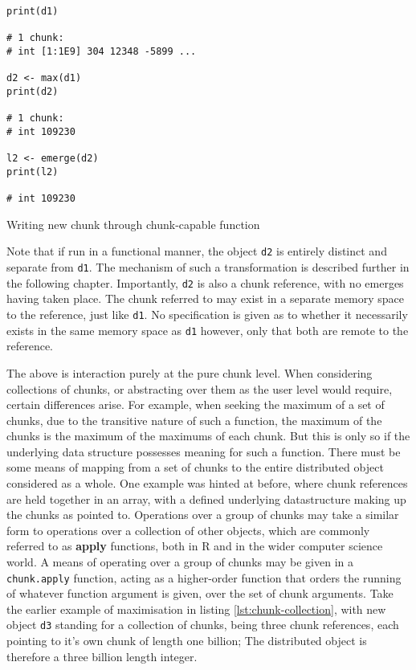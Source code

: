 \begin{listing}
    \begin{verbatim}
print(d1)

# 1 chunk:
# int [1:1E9] 304 12348 -5899 ...

d2 <- max(d1)
print(d2)

# 1 chunk:
# int 109230

l2 <- emerge(d2)
print(l2)

# int 109230
    \end{verbatim}
    \caption{Writing new chunk through chunk-capable function}
    \label{lst:write-chunk}
\end{listing}

Note that if run in a functional manner, the object \texttt{d2} is
entirely distinct and separate from \texttt{d1}. The mechanism of such a
transformation is described further in the following chapter.
Importantly, \texttt{d2} is also a chunk reference, with no emerges
having taken place. The chunk referred to may exist in a separate memory
space to the reference, just like \texttt{d1}. No specification is given
as to whether it necessarily exists in the same memory space as
\texttt{d1} however, only that both are remote to the reference.

The above is interaction purely at the pure chunk level. When
considering collections of chunks, or abstracting over them as the user
level would require, certain differences arise. For example, when
seeking the maximum of a set of chunks, due to the transitive nature of
such a function, the maximum of the chunks is the maximum of the
maximums of each chunk. But this is only so if the underlying data
structure possesses meaning for such a function. There must be some
means of mapping from a set of chunks to the entire distributed object
considered as a whole. One example was hinted at before, where chunk
references are held together in an array, with a defined underlying
datastructure making up the chunks as pointed to. Operations over a
group of chunks may take a similar form to operations over a collection
of other objects, which are commonly referred to as \textbf{apply}
functions, both in R and in the wider computer science world. A means of
operating over a group of chunks may be given in a \texttt{chunk.apply}
function, acting as a higher-order function that orders the running of
whatever function argument is given, over the set of chunk arguments.
Take the earlier example of maximisation in listing \ref{lst:chunk-collection}, with new object \texttt{d3}
standing for a collection of chunks, being three chunk references, each
pointing to it's own chunk of length one billion; The distributed object
is therefore a three billion length integer.

